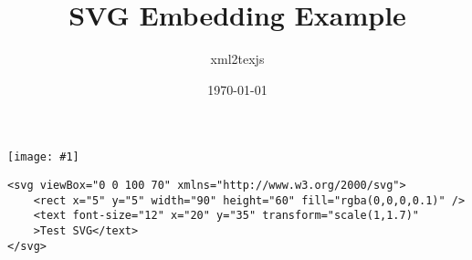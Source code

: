 \documentclass[a4paper,11pt]{article}%
\title{SVG Embedding Example}%
\author{xml2texjs}%
\date{\today}%
\begin{document}
%
    \maketitle\par%
    \providecommand{\svgcodewithpng}[2]{%
\texttt{[image: \#1]}\par%
#2\par
}\svgcodewithpng{.tmp/svg1.tex.xml--1.png}{%
\begin{lstlisting}
<svg viewBox="0 0 100 70" xmlns="http://www.w3.org/2000/svg">
    <rect x="5" y="5" width="90" height="60" fill="rgba(0,0,0,0.1)" />
    <text font-size="12" x="20" y="35" transform="scale(1,1.7)"
    >Test SVG</text>
</svg>
\end{lstlisting}}\par%
\end{document}
